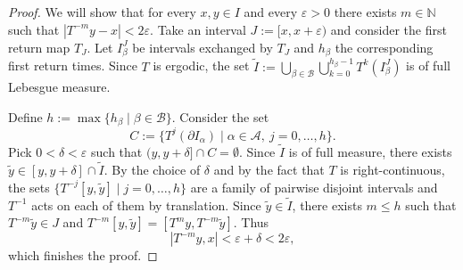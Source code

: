 \documentclass[10pt,a4paper]{article}
\let\epsilon\varepsilon
\theoremstyle{plain}
\theoremstyle{definition}
\newcommand{\A}{\mathcal{A}}
\newcommand{\N}{\mathbb{N}}
\begin{document}
\begin{proof}
We will show that for every $x,y\in I$ and every $\epsilon>0$ there exists $m\in\N$ such that $|T^{-m}y-x|<2\epsilon$. Take an interval $J:=[x,x+\epsilon)$ and consider the first return map $T_J$. Let $I^J_{\beta}$ be intervals exchanged by $T_J$ and $h_{\beta}$ the corresponding first return times. Since $T$ is ergodic, the set $\tilde I:=\bigcup_{\beta\in \mathcal B}\bigcup_{k=0}^{h_{\beta}-1} T^k(I^J_{\beta})$ is of full Lebesgue measure.

Define $h:=\max\{h_{\beta}\mid\beta\in\mathcal B\}$. Consider the set
\[
C:=\{T^{j}(\partial I_{\alpha})\mid \alpha\in\A,\ j=0,\ldots,h\}.
\]
Pick $0<\delta<\epsilon$ such that $(y,y+\delta]\cap C=\emptyset$. Since $\tilde I$ is of full measure, there exists $\tilde y\in[y,y+\delta]\cap \tilde I$. By the choice of $\delta$ and by the fact that $T$ is right-continuous, the sets $\{T^{-j}[y,\tilde y]\mid j=0,\ldots,h\}$ are a family of pairwise disjoint intervals and $T^{-1}$ acts on each of them by translation. Since $\tilde y\in\tilde I$, there exists $m\le h$ such that $T^{-m}\tilde y\in J$ and $T^{-m}[y,\tilde y]=[T^{m}y,T^{-m}\tilde y]$. Thus
\[
|T^{-m}y,x|<\epsilon+\delta<2\epsilon,
\]
which finishes the proof.
\end{proof}
\end{document}
